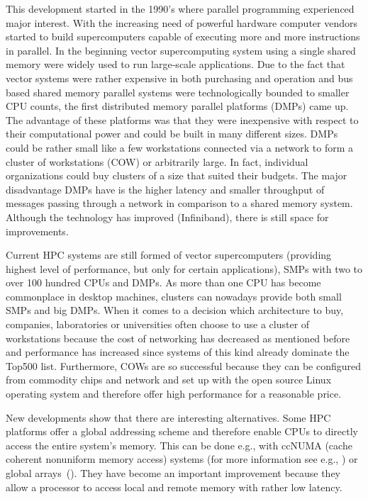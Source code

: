 This development started in the 1990's where parallel programming 
experienced major interest. With the increasing need of powerful
hardware computer vendors started to build supercomputers capable of
executing more and more instructions in parallel. In the beginning
vector supercomputing system using a single shared memory were widely
used to run large-scale applications. Due to the fact that vector
systems were rather expensive in both purchasing and operation and
bus based shared memory parallel systems were technologically bounded
to smaller CPU counts, the first distributed memory parallel platforms (DMPs)
came up. The advantage of these platforms was that they were
inexpensive with respect to their computational power and could be 
built in many different sizes. DMPs could be rather small like a
few workstations connected via a network to form a cluster of
workstations (COW) or arbitrarily large. In fact, individual
organizations could buy clusters of a size that suited their
budgets. The major disadvantage DMPs have is the higher latency and
smaller throughput of messages passing through a network in comparison
to a shared memory system. Although the technology has improved
(Infiniband), there is still space for improvements. 

Current HPC systems are still formed of vector supercomputers
(providing highest level of performance, but only for certain
applications), SMPs with two to over 100 hundred CPUs and DMPs. As
more than one CPU has become commonplace in desktop machines, clusters
can nowadays provide both small SMPs and big DMPs. When it comes to a
decision which architecture to buy, companies, laboratories or
universities often choose to use a cluster of workstations because the
cost of networking has decreased as mentioned before and performance
has increased since systems of this kind already dominate the Top500
list. Furthermore, COWs are so successful because they can be
configured from commodity chips and network and set up with the open source
Linux operating system and therefore offer high performance for a
reasonable price.

New developments show that there are interesting alternatives. Some
HPC platforms offer a global addressing scheme and therefore enable
CPUs to directly access the entire system's memory. This can be done
e.g., with ccNUMA (cache coherent nonuniform memory access) systems
(for more information see e.g., \cite{kleen05NUMA}) or
global arrays~(\cite{nieplocha96gan}).
They have become an important improvement because they allow a
processor to access local and remote memory with rather low latency.

